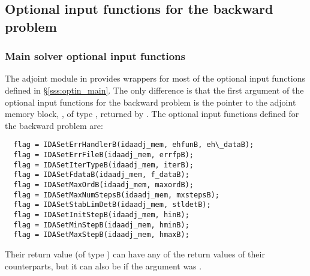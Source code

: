 \subsection{Optional input functions for the backward problem}
\label{ss:optional_input_B}
\subsubsection{Main solver optional input functions}

The adjoint module in {\idas} provides wrappers for most of the optional 
input functions defined in \S\ref{sss:optin_main}. The only difference is 
that the first argument of the optional input functions for the backward problem
is the pointer to the adjoint memory block, , of type ,
returned by . 
The optional input functions defined for the backward problem are:
\begin{verbatim}
  flag = IDASetErrHandlerB(idaadj_mem, ehfunB, eh\_dataB);
  flag = IDASetErrFileB(idaadj_mem, errfpB);
  flag = IDASetIterTypeB(idaadj_mem, iterB);
  flag = IDASetFdataB(idaadj_mem, f_dataB);
  flag = IDASetMaxOrdB(idaadj_mem, maxordB);
  flag = IDASetMaxNumStepsB(idaadj_mem, mxstepsB);
  flag = IDASetStabLimDetB(idaadj_mem, stldetB);
  flag = IDASetInitStepB(idaadj_mem, hinB);
  flag = IDASetMinStepB(idaadj_mem, hminB);
  flag = IDASetMaxStepB(idaadj_mem, hmaxB);
\end{verbatim}
Their return value  (of type ) can have any of the return values 
of their counterparts, but it can also be  if the  
argument was .

